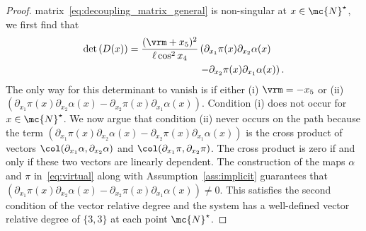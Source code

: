 {\begin{proof}
{  matrix~\eqref{eq:decoupling_matrix_general} is non-singular at $x \in
  \mc{N}^\star$, we first find that
\begin{equation*}
\begin{aligned}
\displaystyle \det{(D(x))}=
\frac{(\vrm+x_{5})^2}{\ell\cos^{2}x_{4}}&\left(\partial_{x_{1}}\pi(x) \partial_{x_{2}}\alpha(x)\right.\\
 &\left.- \partial_{x_{2}}\pi(x) \partial_{x_{1}}\alpha(x) \right).
\end{aligned}
\end{equation*}
The only way for this determinant to vanish is if either (i) $\vrm =
-x_{5}$ or (ii)
$\left(\partial_{x_{1}}\pi(x) \partial_{x_{2}}\alpha(x) -
  \partial_{x_{2}}\pi(x)\partial_{x_{1}}\alpha(x)\right)$. Condition
(i) does not occur for $x \in \mc{N}^\star$. We now
argue that condition (ii) never occurs on the path because the term $\left(\partial_{x_{1}}\pi(x) \partial_{x_{2}}\alpha(x) -
  \partial_{x_{2}}\pi(x)\partial_{x_{1}}\alpha(x)\right)$ is the cross product of vectors
$\col(\partial_{x_{1}}\alpha,\partial_{x_{2}}\alpha)$ and
$\col(\partial_{x_{1}}\pi,\partial_{x_{2}}\pi)$. The cross product is zero if and only if these two vectors are linearly dependent. The construction of the maps $\alpha$ and $\pi$ in~\eqref{eq:virtual} along with Assumption~\ref{ass:implicit} guarantees that $\left(\partial_{x_{1}}\pi(x) \partial_{x_{2}}\alpha(x) -
  \partial_{x_{2}}\pi(x)\partial_{x_{1}}\alpha(x)\right) \neq 0$. This satisfies the second condition of the vector relative degree and the system has a well-defined vector relative degree of $\{3,3\}$ at each point  {$\mc{N}^\star$}. 


}
\end{proof}}

